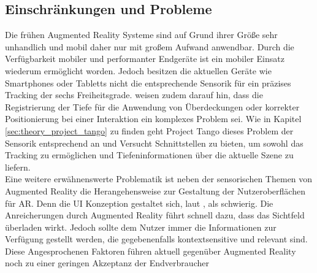 \subsection{Einschränkungen und Probleme}

Die frühen Augmented Reality Systeme sind auf Grund ihrer Größe sehr unhandlich und mobil daher nur mit großem Aufwand anwendbar. Durch die Verfügbarkeit mobiler und performanter Endgeräte ist ein mobiler Einsatz wiederum ermöglicht worden. Jedoch besitzen die aktuellen Geräte wie Smartphones oder Tabletts nicht die entsprechende Sensorik für ein präzises Tracking der sechs Freiheitsgrade. \citet{van2010survey} weisen zudem darauf hin, dass die Registrierung der Tiefe für die Anwendung von Überdeckungen oder korrekter Positionierung bei einer Interaktion ein komplexes Problem sei. Wie in Kapitel \ref{sec:theory_project_tango} zu finden geht Project Tango dieses Problem der Sensorik entsprechend an und Versucht Schnittstellen zu bieten, um sowohl das Tracking zu ermöglichen und Tiefeninformationen über die aktuelle Szene zu liefern. \\

Eine weitere erwähnenswerte Problematik ist neben der sensorischen Themen von Augmented Reality die Herangehensweise zur Gestaltung der Nutzeroberflächen für AR. Denn die UI Konzeption gestaltet sich, laut \citet{azuma2001recent}, als schwierig. Die Anreicherungen durch Augmented Reality führt schnell dazu, dass das Sichtfeld überladen wirkt. Jedoch sollte dem Nutzer immer die Informationen zur Verfügung gestellt werden, die gegebenenfalls kontextsensitive und relevant sind. Diese Angesprochenen Faktoren führen aktuell gegenüber Augmented Reality noch zu einer geringen Akzeptanz der Endverbraucher\\

